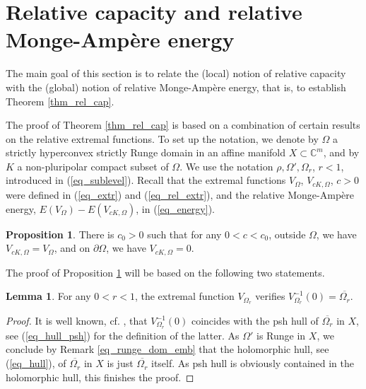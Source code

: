 \documentclass[12pt]{article}
\numberwithin{equation}{section}
\theoremstyle{theorem}
\theoremstyle{definition}
\newtheorem{prop}[thm]{Proposition}
\newtheorem{lem}[thm]{Lemma}
\theoremstyle{remark}
\newtheorem{rem}[thm]{Remark}
\newcommand{\comp}{\mathbb{C}}
\begin{document}
	\section{Relative capacity and relative Monge-Ampère energy}\label{sect_rel_cap}
	The main goal of this section is to relate the (local) notion of relative capacity with the (global) notion of relative Monge-Ampère energy, that is, to establish Theorem \ref{thm_rel_cap}.
	\par 
	The proof of Theorem \ref{thm_rel_cap} is based on a combination of certain results on the relative extremal functions.
	To set up the notation, we denote by $\Omega$ a strictly hyperconvex strictly Runge domain in an affine manifold $X \subset \comp^m$, and by $K$ a non-pluripolar compact subset of $\Omega$. 
	We use the notation $\rho, \Omega', \Omega_r$, $r < 1$, introduced in (\ref{eq_sublevel}).
	Recall that the extremal functions $V_{\Omega}$, $V_{c K, \Omega}$, $c > 0$ were defined in (\ref{eq_extr}) and (\ref{eq_rel_extr}), and the relative Monge-Ampère energy, $E(V_{\Omega}) - E(V_{c K, \Omega})$, in (\ref{eq_energy}).
	\begin{prop}\label{prop_v_ck_om_coin}
		There is $c_0 > 0$ such that for any $0 < c < c_0$, outside $\Omega$, we have $V_{c K, \Omega} = V_{\Omega}$, and on $\partial \Omega$, we have $V_{c K, \Omega} = 0$.
	\end{prop}

	The proof of Proposition \ref{prop_v_ck_om_coin} will be based on the following two statements.
	\begin{lem}\label{lem_extr_fun_lem}
		For any $0 < r < 1$, the extremal function $V_{\Omega_r}$ verifies $V_{\Omega_r}^{-1}(0) = \overline{\Omega_r}$.
	\end{lem}	
	\begin{proof}
		It is well known, cf. \cite[(3.18)]{ZeriahiSic}, that $V_{\Omega_r}^{-1}(0)$ coincides with the psh hull of $\overline{\Omega_r}$ in $X$, see (\ref{eq_hull_psh}) for the definition of the latter.
		As $\Omega'$ is Runge in $X$, we conclude by Remark \ref{eq_runge_dom_emb} that the holomorphic hull, see (\ref{eq_hull}), of $\overline{\Omega_r}$ in $X$ is just $\overline{\Omega_r}$ itself.
		As psh hull is obviously contained in the holomorphic hull, this finishes the proof.
	\end{proof}
\end{document}
